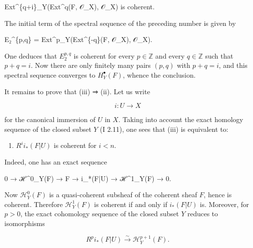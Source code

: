 \documentclass[
]{article}
\newenvironment{Shaded}{}{}
\newcommand{\NormalTok}[1]{#1}
\providecommand{\tightlist}{%
  \setlength{\itemsep}{0pt}\setlength{\parskip}{0pt}}
\begin{document}
\begin{Shaded}
\begin{Highlighting}[]
\NormalTok{Ext\^{}\{q+i\}\_Y(Ext\^{}q(F, 𝒪\_X), 𝒪\_X)    is coherent.}
\end{Highlighting}
\end{Shaded}

The initial term of the spectral sequence of the preceding number is
given by

\begin{Shaded}
\begin{Highlighting}[]
\NormalTok{E₂\^{}\{p,q\} = Ext\^{}p\_Y(Ext\^{}\{{-}q\}(F, 𝒪\_X), 𝒪\_X).}
\end{Highlighting}
\end{Shaded}

One deduces that \(E^{p,q}_{2}\) is coherent for every
\(p \in \mathbb{Z}\) and every \(q \in \mathbb{Z}\) such that
\(p + q = i\). Now there are only finitely many pairs \((p, q)\) with
\(p + q = i\), and this spectral sequence converges to
\(H^{\bullet}_{Y}(F)\), whence the conclusion.

It remains to prove that (iii) ⇒ (ii). Let us write

\[
i : U \to X
\]

for the canonical immersion of \(U\) in \(X\). Taking into account the
exact homology sequence of the closed subset \(Y\) (I 2.11), one sees
that (iii) is equivalent to:

\begin{enumerate}
\def\labelenumi{(\roman{enumi})}
\setcounter{enumi}{3}
\tightlist
\item
  \(R^{i} i_{*}(F|U)\) is coherent for \(i < n\).
\end{enumerate}

Indeed, one has an exact sequence

\begin{Shaded}
\begin{Highlighting}[]
\NormalTok{0 → ℋ\^{}0\_Y(F) → F → i\_*(F|U) → ℋ\^{}1\_Y(F) → 0.}
\end{Highlighting}
\end{Shaded}

Now \(\mathcal{H}^{0}_{Y}(F)\) is a quasi-coherent subsheaf of the
coherent sheaf \(F\), hence is coherent. Therefore
\(\mathcal{H}^{1}_{Y}(F)\) is coherent if and only if \(i_{*}(F|U)\) is.
Moreover, for \(p > 0\), the exact cohomology sequence of the closed
subset \(Y\) reduces to isomorphisms

\[
R^{p} i_{*}(F|U) \xrightarrow{\sim} \mathcal{H}^{p+1}_{Y}(F).
\]
\end{document}
